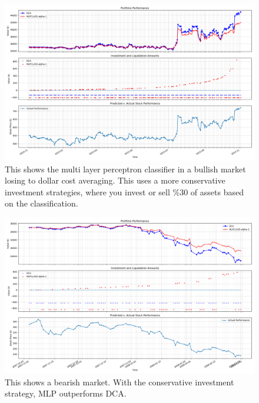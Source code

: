 \documentclass[12pt]{article}
\begin{document}
\begin{figure}
	\centering
	\includegraphics[width=\linewidth]{../Results/GOOG-DCA-MLPCLASS-2014-11-02--2015-11-02--performanceplot}
	\caption{This shows the multi layer perceptron classifier in a bullish market losing to dollar cost averaging. This uses a more conservative investment strategies, where you invest or sell \%30 of assets based on the classification.}
	\label{fig:goog-dca-mlpclass-2014-11-02--2015-11-02--performanceplot}
\end{figure}



\begin{figure}
	\centering
	\includegraphics[width=\linewidth]{../Results/GOOG-DCA-MLPCLASS-2007-11-01--2008-03-01--performanceplot}
	\caption{This shows a bearish market. With the conservative investment strategy, MLP outperforms DCA.}
	\label{fig:goog-dca-mlpclass-2007-11-01--2008-03-01--performanceplot}
\end{figure}
\end{document}

